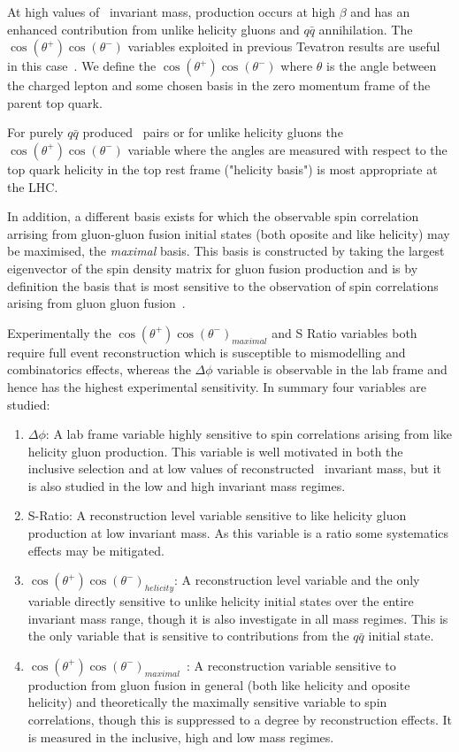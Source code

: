 At high values of \ttbar\ invariant mass, production occurs at high $\beta$ and has an enhanced contribution from unlike helicity gluons and $q\bar{q}$ annihilation. The $\cos(\theta^+)\cos(\theta^-)$ variables exploited in previous Tevatron results are useful in this case~\cite{do_spin}. We define the $\cos(\theta^+)\cos(\theta^-)$ where $\theta$ is the angle between the charged lepton and some chosen basis in the zero momentum frame of the parent top quark.

For purely $q\bar{q}$ produced \ttbar\ pairs or for unlike helicity gluons the $\cos(\theta^+)\cos(\theta^-)$ variable where the angles are measured with respect to the top quark helicity in the top rest frame ("helicity basis") is most appropriate at the LHC. 

In addition, a different basis exists for which the observable spin correlation arrising from gluon-gluon fusion initial states (both oposite and like helicity) may be maximised, the \emph{maximal} basis. This basis is constructed by taking the largest eigenvector of the spin density matrix for gluon fusion production and is by definition the basis that is most sensitive to the observation of spin correlations arising from gluon gluon fusion~\cite{Uwer:2004vp}. 

Experimentally the $\cos(\theta^+)\cos(\theta^-)_{maximal}$ and S Ratio variables both require full event reconstruction which is susceptible to mismodelling and combinatorics effects, whereas the $\Delta\phi$ variable is observable in the lab frame and hence has the highest experimental sensitivity. 
\newline
\newline
In summary four variables are studied:
\begin{enumerate}
\item $\Delta\phi$: A lab frame variable highly sensitive to spin correlations arising from like helicity gluon production. This variable is well motivated in both the inclusive selection and at low values of reconstructed \ttbar\ invariant mass, but it is also studied in the low and high invariant mass regimes.
\item S-Ratio\cite{mahlon:2010}: A reconstruction level variable sensitive to like helicity gluon production at low invariant mass. As this variable is a ratio some systematics effects may be mitigated. 
\item $\cos(\theta^+)\cos(\theta^-)_{helicity}$: A reconstruction level variable and the only variable directly sensitive to unlike helicity initial states over the entire invariant mass range, though it is also investigate in all mass regimes. This is the only variable that is sensitive to contributions from the $q\bar{q}$ initial state.
\item $\cos(\theta^+)\cos(\theta^-)_{maximal}$~\cite{Uwer:2004vp}: A reconstruction variable sensitive to production from gluon fusion in general (both like helicity and oposite helicity) and theoretically the maximally sensitive variable to spin correlations, though this is suppressed to a degree by reconstruction effects. It is measured in the inclusive, high and low mass regimes.
\end{enumerate}

